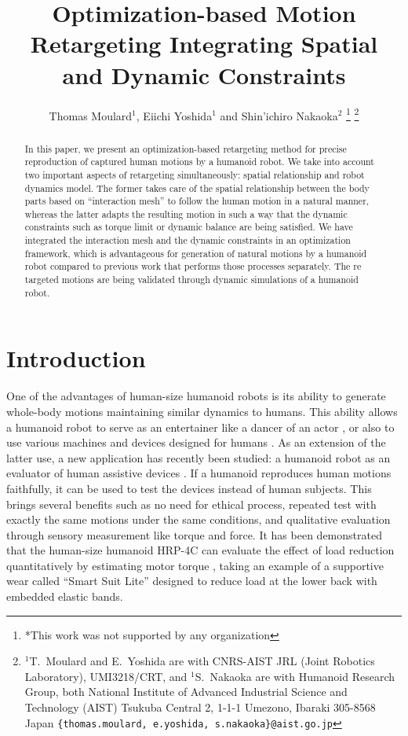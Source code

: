 \documentclass[letterpaper, 10 pt, conference]{ieeeconf}  %
\title{\LARGE \bf
Optimization-based Motion Retargeting Integrating Spatial and Dynamic Constraints
}
\author{Thomas Moulard$^{1}$, Eiichi Yoshida$^{1}$ and Shin'ichiro
  Nakaoka$^{2}$%
\thanks{*This work was not supported by any organization}%
\thanks{$^{1}$T.~Moulard and E.~Yoshida are with CNRS-AIST JRL (Joint
  Robotics Laboratory), UMI3218/CRT, and $^{1}$S.~Nakaoka are with
  Humanoid Research Group, both National Institute of Advanced Industrial Science and Technology (AIST)
Tsukuba Central 2, 1-1-1 Umezono, Ibaraki 305-8568 Japan
        {\tt\footnotesize \{thomas.moulard, e.yoshida, s.nakaoka\}@aist.go.jp}}%
}
\begin{document}
\maketitle
\thispagestyle{empty}
\pagestyle{empty}


\begin{abstract}
In this paper, we present an optimization-based retargeting method for
precise reproduction of captured human motions by a humanoid robot.
We take into account two important aspects of retargeting
simultaneously: spatial relationship and robot dynamics model.  The
former takes care of the spatial relationship between the body parts
based on ``interaction mesh'' to follow the human motion in a natural
manner, whereas the latter adapts the resulting motion in such a way
that the dynamic constraints such as torque limit or dynamic balance
are being satisfied.  We have integrated the interaction mesh and the
dynamic constraints in an optimization framework, which is
advantageous for generation of natural motions by a humanoid robot
compared to previous work that performs those processes
separately. The re targeted motions are being validated through dynamic
simulations of a humanoid robot.
\end{abstract}


\section{Introduction}
\label{sec:intro}

One of the advantages of human-size humanoid robots is
its ability to generate whole-body motions maintaining similar
dynamics to humans.
This ability allows a humanoid robot to serve as an entertainer like
a dancer of an actor \cite{nakaoka_iros2010}, or also to use various
machines and devices designed for humans \cite{Yokoi03iros}.
As an extension of the latter use, a new application
has recently been studied: a humanoid robot as an evaluator of human
assistive devices \cite{Takanishi06ICRA,Miura13ICRA}.
If a humanoid reproduces human motions faithfully, it can be used to
test the devices instead of human subjects.
This brings several benefits such as no need for ethical
process, repeated test with exactly the same motions under the same
conditions, and qualitative evaluation through sensory measurement
like torque and force.
It has been demonstrated that the human-size humanoid HRP-4C
\cite{Kaneko09Humanoids}  can evaluate the effect of load reduction
quantitatively by estimating motor torque \cite{Miura13ICRA}, taking
an example of a supportive wear called ``Smart Suit Lite''
\cite{Tanaka11JRM} designed to reduce load
at the lower back with embedded elastic bands.
\end{document}
